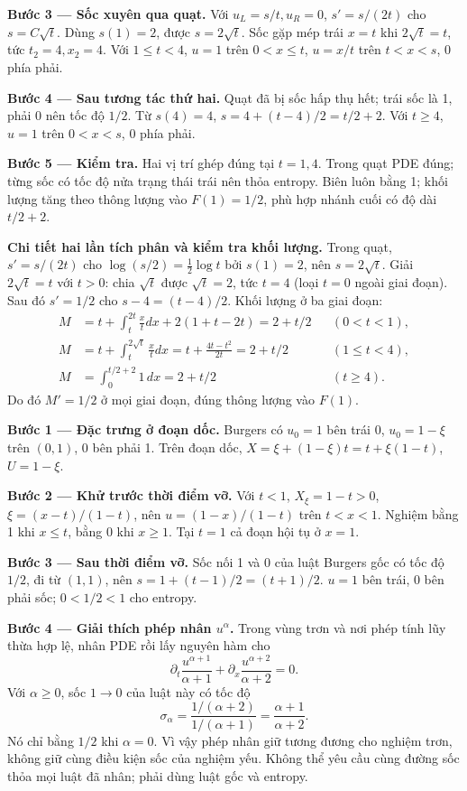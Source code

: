 \textbf{Bước 3 — Sốc xuyên qua quạt.} Với $u_L=s/t,u_R=0$, $s'=s/(2t)$ cho $s=C\sqrt t$. Dùng $s(1)=2$, được $s=2\sqrt t$. Sốc gặp mép trái $x=t$ khi $2\sqrt t=t$, tức $t_2=4,x_2=4$. Với $1\le t<4$, $u=1$ trên $0<x\le t$, $u=x/t$ trên $t<x<s$, 0 phía phải.

\textbf{Bước 4 — Sau tương tác thứ hai.} Quạt đã bị sốc hấp thụ hết; trái sốc là 1, phải 0 nên tốc độ $1/2$. Từ $s(4)=4$, $s=4+(t-4)/2=t/2+2$. Với $t\ge4$, $u=1$ trên $0<x<s$, 0 phía phải.

\textbf{Bước 5 — Kiểm tra.} Hai vị trí ghép đúng tại $t=1,4$. Trong quạt PDE đúng; từng sốc có tốc độ nửa trạng thái trái nên thỏa entropy. Biên luôn bằng 1; khối lượng tăng theo thông lượng vào $F(1)=1/2$, phù hợp nhánh cuối có độ dài $t/2+2$.

\textbf{Chi tiết hai lần tích phân và kiểm tra khối lượng.} Trong quạt, $s'=s/(2t)$ cho $\log(s/2)=\frac12\log t$ bởi $s(1)=2$, nên $s=2\sqrt t$. Giải $2\sqrt t=t$ với $t>0$: chia $\sqrt t$ được $\sqrt t=2$, tức $t=4$ (loại $t=0$ ngoài giai đoạn). Sau đó $s'=1/2$ cho $s-4=(t-4)/2$. Khối lượng ở ba giai đoạn:
\[\begin{aligned}
M&=t+\int_t^{2t}\frac xtdx+2(1+t-2t)=2+t/2 &&(0<t<1),\\
M&=t+\int_t^{2\sqrt t}\frac xtdx=t+\frac{4t-t^2}{2t}=2+t/2 &&(1\le t<4),\\
M&=\int_0^{t/2+2}1\,dx=2+t/2 &&(t\ge4).
\end{aligned}\]
Do đó $M'=1/2$ ở mọi giai đoạn, đúng thông lượng vào $F(1)$.

\textbf{Bước 1 — Đặc trưng ở đoạn dốc.} Burgers có $u_0=1$ bên trái 0, $u_0=1-\xi$ trên $(0,1)$, 0 bên phải 1. Trên đoạn dốc, $X=\xi+(1-\xi)t=t+\xi(1-t)$, $U=1-\xi$.

\textbf{Bước 2 — Khử trước thời điểm vỡ.} Với $t<1$, $X_\xi=1-t>0$, $\xi=(x-t)/(1-t)$, nên $u=(1-x)/(1-t)$ trên $t<x<1$. Nghiệm bằng 1 khi $x\le t$, bằng 0 khi $x\ge1$. Tại $t=1$ cả đoạn hội tụ ở $x=1$.

\textbf{Bước 3 — Sau thời điểm vỡ.} Sốc nối 1 và 0 của luật Burgers gốc có tốc độ $1/2$, đi từ $(1,1)$, nên $s=1+(t-1)/2=(t+1)/2$. $u=1$ bên trái, 0 bên phải sốc; $0<1/2<1$ cho entropy.

\textbf{Bước 4 — Giải thích phép nhân $u^\alpha$.} Trong vùng trơn và nơi phép tính lũy thừa hợp lệ, nhân PDE rồi lấy nguyên hàm cho
\[\partial_t\frac{u^{\alpha+1}}{\alpha+1}+\partial_x\frac{u^{\alpha+2}}{\alpha+2}=0.\]
Với $\alpha\ge0$, sốc $1\to0$ của luật này có tốc độ
\[\sigma_\alpha=\frac{1/(\alpha+2)}{1/(\alpha+1)}=\frac{\alpha+1}{\alpha+2}.\]
Nó chỉ bằng $1/2$ khi $\alpha=0$. Vì vậy phép nhân giữ tương đương cho nghiệm trơn, không giữ cùng điều kiện sốc của nghiệm yếu. Không thể yêu cầu cùng đường sốc thỏa mọi luật đã nhân; phải dùng luật gốc và entropy.

